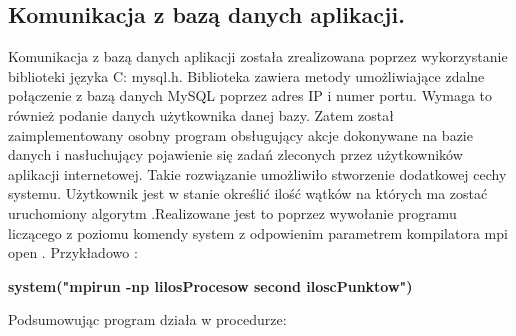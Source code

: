 \documentclass[a4paper,12pt]{article}		%
\begin{document}


\subsection{Komunikacja z bazą danych aplikacji.}
Komunikacja z bazą danych aplikacji została zrealizowana poprzez wykorzystanie biblioteki języka C: mysql.h. Biblioteka zawiera metody umożliwiające zdalne połączenie z bazą danych MySQL poprzez adres IP i numer portu. Wymaga to również podanie danych użytkownika danej bazy. Zatem został zaimplementowany osobny program obsługujący akcje dokonywane na bazie danych i nasłuchujący pojawienie się zadań zleconych przez użytkowników aplikacji internetowej. Takie rozwiązanie umożliwiło stworzenie dodatkowej cechy systemu. Użytkownik jest w stanie określić ilość wątków na których ma zostać uruchomiony algorytm .Realizowane jest to poprzez wywołanie programu liczącego z poziomu komendy system z odpowienim parametrem kompilatora mpi open . Przykładowo :

\begin{center}
\textbf{system("mpirun -np lilosProcesow second iloscPunktow")}
\end{center}

Podsumowując program działa w procedurze:
\end{document}
